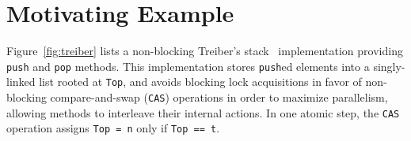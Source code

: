 
\section{Motivating Example}
\label{sec:motivation}

Figure~\ref{fig:treiber} lists a non-blocking Treiber's stack~\cite{Treiber'86}
implementation providing {\tt push} and {\tt pop} methods. This implementation
stores {\tt push}ed elements into a singly-linked list rooted at {\tt Top}, and
avoids blocking lock acquisitions in favor of non-blocking compare-and-swap
({\tt CAS}) operations in order to maximize parallelism, allowing methods to
interleave their internal actions. In one atomic step, the {\tt CAS} operation
assigns {\tt Top = n} only if {\tt Top == t}.


